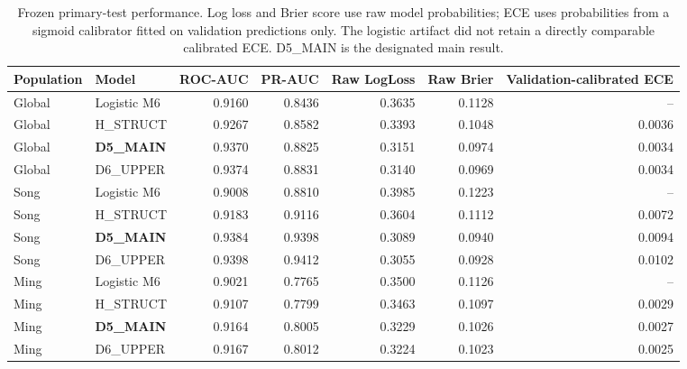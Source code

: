 \begin{table}[t]
\caption{Frozen primary-test performance. Log loss and Brier score use raw model probabilities; ECE uses probabilities from a sigmoid calibrator fitted on validation predictions only. The logistic artifact did not retain a directly comparable calibrated ECE. D5\_MAIN is the designated main result.}
\label{tab:performance}
\centering
\begin{tabular}{llrrrrr}
\toprule
Population & Model & ROC-AUC & PR-AUC & Raw LogLoss & Raw Brier & Validation-calibrated ECE \\
\midrule
Global & Logistic M6 & 0.9160 & 0.8436 & 0.3635 & 0.1128 & -- \\
Global & H\_STRUCT & 0.9267 & 0.8582 & 0.3393 & 0.1048 & 0.0036 \\
Global & \textbf{D5\_MAIN} & 0.9370 & 0.8825 & 0.3151 & 0.0974 & 0.0034 \\
Global & D6\_UPPER & 0.9374 & 0.8831 & 0.3140 & 0.0969 & 0.0034 \\
Song & Logistic M6 & 0.9008 & 0.8810 & 0.3985 & 0.1223 & -- \\
Song & H\_STRUCT & 0.9183 & 0.9116 & 0.3604 & 0.1112 & 0.0072 \\
Song & \textbf{D5\_MAIN} & 0.9384 & 0.9398 & 0.3089 & 0.0940 & 0.0094 \\
Song & D6\_UPPER & 0.9398 & 0.9412 & 0.3055 & 0.0928 & 0.0102 \\
Ming & Logistic M6 & 0.9021 & 0.7765 & 0.3500 & 0.1126 & -- \\
Ming & H\_STRUCT & 0.9107 & 0.7799 & 0.3463 & 0.1097 & 0.0029 \\
Ming & \textbf{D5\_MAIN} & 0.9164 & 0.8005 & 0.3229 & 0.1026 & 0.0027 \\
Ming & D6\_UPPER & 0.9167 & 0.8012 & 0.3224 & 0.1023 & 0.0025 \\
\bottomrule
\end{tabular}
\end{table}
